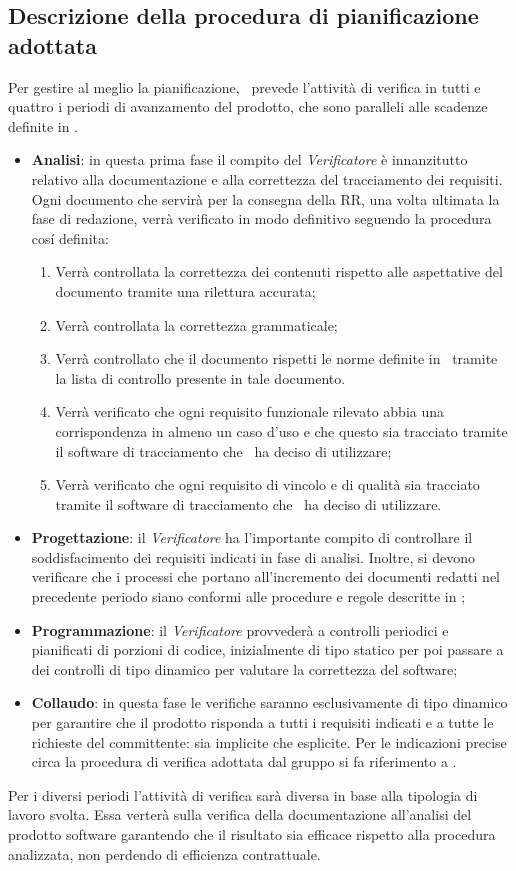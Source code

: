 \subsection{Descrizione della procedura di pianificazione adottata}
Per gestire al meglio la pianificazione, \gruppo ~prevede l'attività di verifica in tutti e quattro i periodi di avanzamento del prodotto, che sono paralleli alle scadenze definite in \infoPDP.
\begin{itemize}
\item \textbf{Analisi}: in questa prima fase il compito del \textit{Verificatore} è innanzitutto relativo alla documentazione e alla correttezza del tracciamento dei requisiti. Ogni documento che servirà per la consegna della RR, una volta ultimata la fase di redazione, verrà verificato in modo definitivo seguendo la procedura cos\'i definita:
\begin{enumerate}
\item Verrà controllata la correttezza dei contenuti rispetto alle aspettative del documento tramite una rilettura accurata;
\item Verrà controllata la correttezza grammaticale;
\item Verrà controllato che il documento rispetti le norme definite in \infoNDP ~tramite la lista di controllo presente in tale documento.
\item Verrà verificato che ogni requisito funzionale rilevato abbia una corrispondenza in almeno un caso d'uso e che questo sia tracciato tramite il software di tracciamento che \gruppo ~ha deciso di utilizzare;
\item Verrà verificato che ogni requisito di vincolo e di qualità sia tracciato tramite il software di tracciamento che \gruppo ~ha deciso di utilizzare.
\end{enumerate}
\item \textbf{Progettazione}: il \textit{Verificatore} ha l'importante compito di controllare il soddisfacimento dei requisiti indicati in fase di analisi. Inoltre, si devono verificare che i processi che portano all'incremento dei documenti redatti nel precedente periodo siano conformi alle procedure e regole descritte in \infoNDP;
\item \textbf{Programmazione}: il \textit{Verificatore} provvederà a controlli periodici e pianificati di porzioni di codice, inizialmente di tipo statico per poi passare a dei controlli di tipo dinamico per valutare la correttezza del software;
\item \textbf{Collaudo}: in questa fase le verifiche saranno esclusivamente di tipo dinamico per garantire che il prodotto risponda a tutti i requisiti indicati e a tutte le richieste del committente: sia implicite che esplicite.
Per le indicazioni precise circa la procedura di verifica adottata dal gruppo si fa riferimento a \infoNDP.
\end{itemize}
Per i diversi periodi l'attività di verifica sarà diversa in base alla tipologia di lavoro svolta. Essa verterà sulla verifica della documentazione all'analisi del prodotto software garantendo che il risultato sia efficace rispetto alla procedura analizzata, non perdendo di efficienza contrattuale. 
